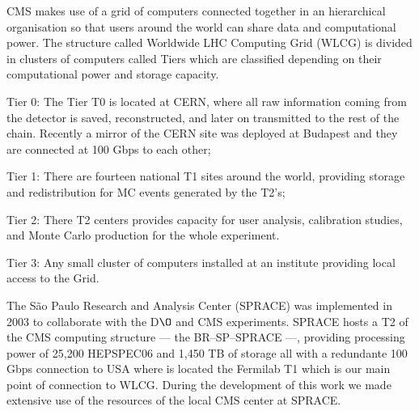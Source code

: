 CMS makes use of a grid of computers connected together in an hierarchical organisation so that users around the world can share data and computational power. The structure called Worldwide LHC Computing Grid (WLCG) is divided in clusters of computers called Tiers which are classified depending on their computational power and storage capacity.
\begin{compact_itemize}
\item Tier 0: The Tier T0 is located at CERN, where all raw information coming from the detector is saved, reconstructed, and later on transmitted to the rest of the chain. Recently a mirror of the CERN site was deployed at Budapest and they are connected at 100 Gbps to each other;
\item Tier 1: There are fourteen national T1 sites around the world, providing storage and redistribution for MC events generated by the T2's;
\item Tier 2: There T2 centers provides capacity for user analysis, calibration studies, and Monte Carlo production for the whole experiment.   
\item Tier 3: Any small cluster of computers installed at an institute providing local access to the Grid.
\end{compact_itemize}

The S\~ao Paulo Research and Analysis Center (SPRACE) \cite{sprace} was implemented in 2003 to collaborate with the D$\O$ and CMS experiments. SPRACE hosts a T2 of the CMS computing structure --- the BR--SP--SPRACE ---, providing processing power of 25,200 HEPSPEC06 and 1,450 TB of storage all with a redundante 100 Gbps connection to USA where is located the Fermilab T1 which is our main point of connection to WLCG. During the development of this work we made extensive use of  the resources of the local CMS center at SPRACE.




